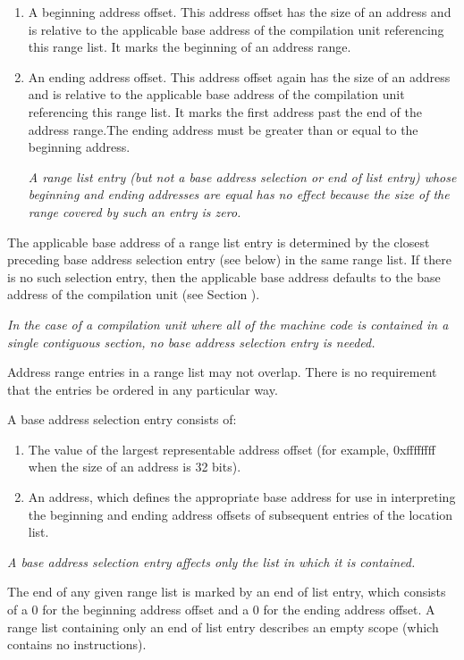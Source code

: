 \begin{enumerate}[1]
\item A beginning address offset. This address offset has the size of an address and is relative to
the applicable base address of the compilation unit referencing this range list. It marks the
beginning of an address range.

\item An ending address offset. This address offset again has the size of an address and is relative
to the applicable base address of the compilation unit referencing this range list. It marks the
first address past the end of the address range.The ending address must be greater than or
equal to the beginning address.

\textit{A range list entry (but not a base address selection or end of list entry) whose beginning and
ending addresses are equal has no effect because the size of the range covered by such an
entry is zero.}
\end{enumerate}

The applicable base address of a range list entry is determined
by the closest preceding base address selection entry (see
below) in the same range list. If there is no such selection
entry, then the applicable base address defaults to the base
address of the compilation unit 
(see Section ).

\textit{In the case of a compilation unit where all of the machine
code is contained in a single contiguous section, no base
address selection entry is needed.}

Address range entries in
a range list may not overlap. There is no requirement that
the entries be ordered in any particular way.

A base address selection entry consists of:

\begin{enumerate}[1]
\item The value of the largest representable address offset (for example, 0xffffffff when the size of
an address is 32 bits).

\item An address, which defines the appropriate base address for use in interpreting the beginning
and ending address offsets of subsequent entries of the location list.
\end{enumerate}
\textit{A base address selection entry 
affects only the list in which it is contained.}


The end of any given range list is marked by an end of
list entry, which consists of a 0 for the beginning address
offset and a 0 for the ending address offset. A range list
containing only an end of list entry describes an empty scope
(which contains no instructions).

